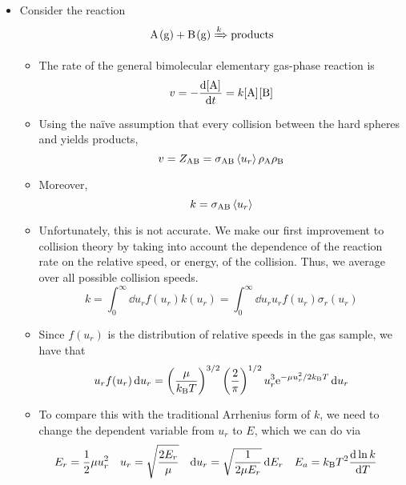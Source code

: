 \documentclass[../notes.tex]{subfiles}
\begin{document}
\begin{itemize}
    \item Consider the reaction
    \begin{equation*}
        \ce{A(g) + B(g)} \xRightarrow{k} \ce{products}
    \end{equation*}
    \begin{itemize}
        \item The rate of the general bimolecular elementary gas-phase reaction is
        \begin{equation*}
            v = -\dv{\cnc{A}}{t} = k\cnc{A}\cnc{B}
        \end{equation*}
        \item Using the na\"{i}ve assumption that every collision between the hard spheres  and  yields products,
        \begin{equation*}
            v = Z_{\ce{A}\ce{B}} = \sigma_{\ce{A}\ce{B}}\prb{u_r}\rho_{\ce{A}}\rho_{\ce{B}}
        \end{equation*}
        \item Moreover,
        \begin{equation*}
            k = \sigma_{\ce{A}\ce{B}}\prb{u_r}
        \end{equation*}
        \item Unfortunately, this is not accurate. We make our first improvement to collision theory by taking into account the dependence of the reaction rate on the relative speed, or energy, of the collision. Thus, we average over all possible collision speeds.
        \begin{equation*}
            k = \int_0^\infty\dd{u_r}f(u_r)k(u_r)
            = \int_0^\infty\dd{u_r}u_rf(u_r)\sigma_r(u_r)
        \end{equation*}
        \item Since $f(u_r)$ is the distribution of relative speeds in the gas sample, we have that
        \begin{equation*}
            u_rf(u_r)\dd{u_r} = \left( \frac{\mu}{\kB T} \right)^{3/2}\left( \frac{2}{\pi} \right)^{1/2}u_r^3\e[-\mu u_r^2/2\kB T]\dd{u_r}
        \end{equation*}
        \item To compare this with the traditional Arrhenius form of $k$, we need to change the dependent variable from $u_r$ to $E$, which we can do via
        \begin{align*}
            E_r &= \frac{1}{2}\mu u_r^2&
            u_r &= \sqrt{\frac{2E_r}{\mu}}&
            \dd{u_r} &= \sqrt{\frac{1}{2\mu E_r}}\dd{E_r}&
            E_a &= \kB T^2\dv{\ln k}{T}
        \end{align*}
    \end{itemize}
\end{itemize}
\end{document}
